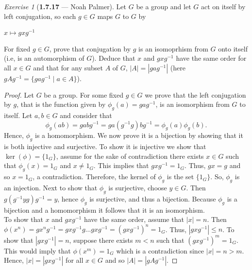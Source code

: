 \documentclass[12pt]{amsart}
\theoremstyle{remark}
\newtheorem*{exercise}{Exercise}%
\theoremstyle{mycomment}
\begin{document}
\begin{exercise}[\textbf{1.7.17} --- Noah Palmer] Let $G$ be a group and let $G$ act on itself by left conjugation, so each $g\in G$ maps $G$ to $G$ by\\
  \begin{center}
  $x\mapsto gxg^{-1}$
  \end{center}
  For fixed $g\in G$, prove that conjugation by $g$ is an isomoprhism from $G$ onto itself (i.e, is an automorphism of $G$). Deduce that $x$ and $gxg^{-1}$ have the same order for all $x\in G$ and that for any subset $A$ of $G$, $|A|=|gag^{-1}|$ (here $gAg^{-1}=\{gag^{-1}\mid a\in A\}$).
  \begin{proof}
  Let $G$ be a group. For some fixed $g\in G$ we prove that the left conjugation by $g$, that is the function given by $\phi_g(a)=gag^{-1}$, is an isomorphism from $G$ to itself. Let $a,b\in G$ and consider that
  $$\phi_g(ab)=gabg^{-1}=ga(g^{-1}g)bg^{-1}=\phi_g(a)\phi_g(b).$$
  Hence, $\phi_g$ is a homomorphism. We now prove it is a bijection by showing that it is both injective and surjective. To show it is injective we show that $\ker(\phi)=\{1_G\}$, assume for the sake of contradiction there exists $x\in G$ such that $\phi_g(x)=1_G$ and $x\neq 1_G$. This implies that $gxg^{-1}=1_G$. Thus, $gx=g$ and so $x=1_G$, a contradiction. Therefore, the kernel of $\phi_g$ is the set $\{1_G\}$. So, $\phi_g$ is an injection. Next to show that $\phi_g$ is surjective, choose $y\in G$. Then $g(g^{-1}yg)g^{-1}=y$, hence $\phi_g$ is surjective, and thus a bijection. Because $\phi_g$ is a bijection and a homomorphism it follows that it is an isomorphism. \\
  To show that $x$ and $gxg^{-1}$ have the same order, assume that $|x|=n$. Then $\phi(x^n)=gx^ng^{-1}=gxg^{-1}g\ldots gxg^{-1}=(gxg^{-1})^n=1_G$. Thus, $|gxg^{-1}|\leq n$. To show that $|gxg^{-1}|=n$, suppose there exists $m<n$ such that $(gxg^{-1})^m=1_G$. This would imply that $\phi(x^m)=1_G$ which is a contradiction since $|x|=n>m$. Hence, $|x|=|gxg^{-1}|$ for all $x\in G$ and so $|A|=|gAg^{-1}|$.
  \end{proof}
  \end{exercise}
\vspace{.15in}
\end{document}
